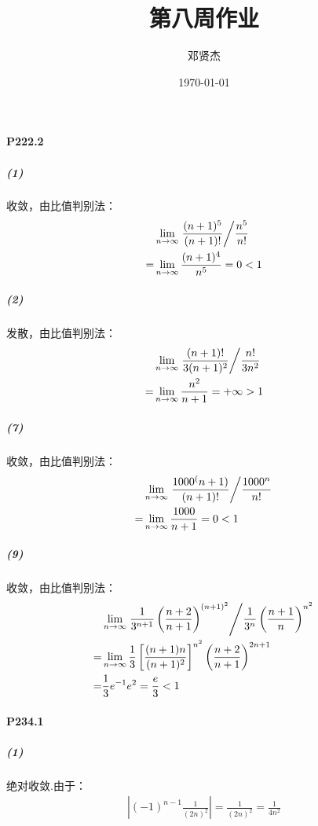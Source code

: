 \documentclass[UTF8]{ctexart}
\title{第八周作业}
\author{邓贤杰}
\date{\today}
\begin{document}
    \maketitle
    \paragraph*{P222.2}
    \subparagraph*{(1)}
    收敛，由比值判别法：
    \begin{align*}
        &\lim \limits_{n \to \infty} \left. \frac{(n+1)^5}{(n+1)!} \middle/ \frac{n^5}{n!} \right. \\
        =& \lim \limits_{n \to \infty} \frac{(n+1)^4}{n^5} =0 < 1
    \end{align*}
    
    \subparagraph*{(2)}
    发散，由比值判别法：
    \begin{align*}
        &\lim \limits_{n \to \infty} \left. \frac{(n+1)!}{3(n+1)^2} \middle/ \frac{n!}{3n^2} \right. \\
        =& \lim \limits_{n \to \infty} \frac{n^2}{n+1} = +\infty > 1
    \end{align*}

    \subparagraph*{(7)}
    收敛，由比值判别法：
    \begin{align*}
        &\lim \limits_{n \to \infty} \left. \frac{1000^(n+1)}{(n+1)!} \middle/ \frac{1000^n}{n!} \right. \\
        =& \lim \limits_{n \to \infty} \frac{1000}{n+1} = 0 < 1
    \end{align*}

    \subparagraph*{(9)}
    收敛，由比值判别法：
    \begin{align*}
        &\lim \limits_{n \to \infty} \left. \frac{1}{3^{n+1}} \left(\frac{n+2}{n+1}\right)^{(n+1)^2} \middle/
         \frac{1}{3^n} \left(\frac{n+1}{n}\right)^{n^2} \right. \\
        =& \lim \limits_{n \to \infty} \frac{1}{3} 
        \left[\frac{(n+1)n}{(n+1)^2} \right]^{n^2} \left(\frac{n+2}{n+1} \right)^{2n+1} \\
        =& \frac{1}{3} e^{-1} e^2 = \frac{e}{3} < 1
    \end{align*}

    \paragraph*{P234.1}
    \subparagraph*{(1)}
    绝对收敛.由于：
    \begin{align*}
        \left|(-1)^{n-1}\frac{1}{(2n)^2}\right| = \frac{1}{(2n)^2}  = \frac{1}{4n^2} 
    \end{align*}
\end{document}
